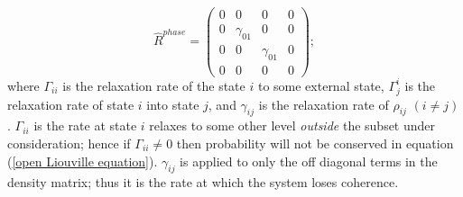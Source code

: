 \begin{equation}
\hat{R}^{phase}
=
\left(
\begin{array}{cccc}
0 & 0 & 0 & 0 \\
0 & \gamma_{01} & 0 & 0 \\
0 & 0 & \gamma_{01} & 0 \\
0 & 0 & 0 & 0 
\end{array}
\right);
\label{dephase}
\end{equation}
where $\Gamma_{ii}$ is the relaxation rate of the state $i$ to some external state, $\Gamma^i_j$ is the relaxation rate of state $i$ into state $j$, and $\gamma_{ij}$ is the relaxation rate of $\rho_{ij}$ $(i \not= j)$. $\Gamma_{ii}$ is the rate at state $i$ relaxes to some other level \emph{outside} the subset under consideration; hence if $\Gamma_{ii}\not=0$ then probability will not be conserved in equation (\ref{open Liouville equation}). $\gamma_{ij}$ is applied to only the off diagonal terms in the density matrix; thus it is the rate at which the system loses coherence.

